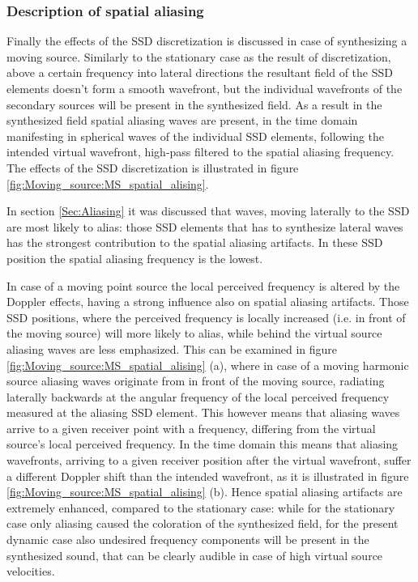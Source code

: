 \subsubsection{Description of spatial aliasing}
Finally the effects of the SSD discretization is discussed in case of synthesizing a moving source.
Similarly to the stationary case as the result of discretization, above a certain frequency into lateral directions the resultant field of the SSD elements doesn't form a smooth wavefront, but the individual wavefronts of the secondary sources will be present in the synthesized field.
As a result in the synthesized field spatial aliasing waves are present, in the time domain manifesting in spherical waves of the individual SSD elements, following the intended virtual wavefront, high-pass filtered to the spatial aliasing frequency.
The effects of the SSD discretization is illustrated in figure \ref{fig:Moving_source:MS_spatial_alising}.

In section \ref{Sec:Aliasing} it was discussed that waves, moving laterally to the SSD are most likely to alias: those SSD elements that has to synthesize lateral waves has the strongest contribution to the spatial aliasing artifacts.
In these SSD position the spatial aliasing frequency is the lowest.

In case of a moving point source the local perceived frequency is altered by the Doppler effects, having a strong influence also on spatial aliasing artifacts.
Those SSD positions, where the perceived frequency is locally increased (i.e. in front of the moving source) will more likely to alias, while behind the virtual source aliasing waves are less emphasized.
This can be examined in figure \ref{fig:Moving_source:MS_spatial_alising} (a), where in case of a moving harmonic source aliasing waves originate from in front of the moving source, radiating laterally backwards at the angular frequency of the local perceived frequency measured at the aliasing SSD element.
This however means that aliasing waves arrive to a given receiver point with a frequency, differing from the virtual source's local perceived frequency.
In the time domain this means that aliasing wavefronts, arriving to a given receiver position after the virtual wavefront, suffer a different Doppler shift than the intended wavefront, as it is illustrated in figure \ref{fig:Moving_source:MS_spatial_alising} (b).
Hence spatial aliasing artifacts are extremely enhanced, compared to the stationary case: while for the stationary case only aliasing caused the coloration of the synthesized field, for the present dynamic case also undesired frequency components will be present in the synthesized sound, that can be clearly audible in case of high virtual source velocities.

